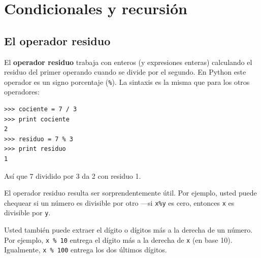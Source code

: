

\chapter{Condicionales y recursión}

\section{El operador residuo}

El {\bf operador residuo} trabaja con enteros (y expresiones enteras)
calculando el residuo del primer operando cuando se divide por el segundo.
En Python este operador es un signo porcentaje ({\tt\%}). 
La sintaxis es la misma que para los otros operadores:

\beforeverb
\begin{verbatim}
>>> cociente = 7 / 3
>>> print cociente
2
>>> residuo = 7 % 3
>>> print residuo
1
\end{verbatim}
\afterverb
%
Así que 7 dividido por 3 da 2 con residuo 1.

El operador residuo resulta ser sorprendentemente útil. Por ejemplo,
usted puede chequear si un número es divisible por otro ---si
\texttt{x\%y} es cero, entonces \texttt{x} es divisible por \texttt{y}.

Usted también puede extraer el dígito o dígitos más a la derecha
de un número. Por ejemplo, \texttt{x \% 10} entrega el dígito más a la derecha
de  \texttt{x} (en base 10).  Igualmente, \texttt{x \% 100}
entrega los dos últimos dígitos.


